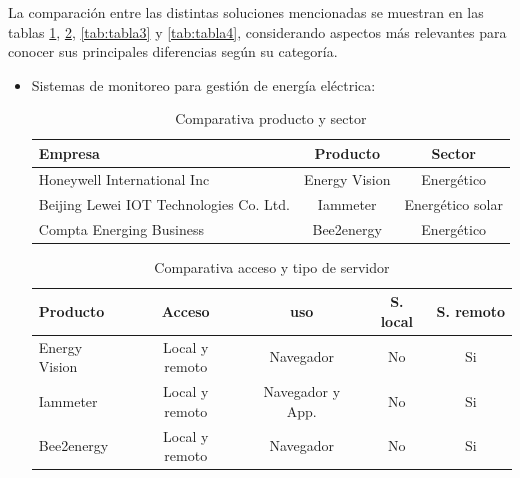 La comparación entre las distintas soluciones mencionadas se muestran en las tablas \ref{tab:tabla1}, \ref{tab:tabla2},  \ref{tab:tabla3} y \ref{tab:tabla4}, considerando aspectos más relevantes para conocer sus principales diferencias según su categoría. 
\begin{itemize}
\item Sistemas de monitoreo para gestión de energía eléctrica:

\begin{table}[h]
	\centering
	\caption[Comparativa de soluciones entre producto y sector]{Comparativa producto y sector}
	\begin{tabular}{l c c }    
		\toprule
		\textbf{Empresa} 	& \textbf{Producto} & \textbf{Sector}  \\
		\midrule
		Honeywell International Inc & Energy Vision & Energético \\		
		Beijing Lewei IOT Technologies Co. Ltd.	 & Iammeter	& Energético solar \\
		Compta Energing Business	 & Bee2energy	& Energético \\
		\bottomrule
		\hline
	\end{tabular}
	\label{tab:tabla1}
\end{table}



\begin{table}[h]
	\centering
	\caption[Comparativa de soluciones entre acceso y servidor]{Comparativa acceso y tipo de servidor}
	\begin{tabular}{l c c c c }    
		\toprule
		\textbf{Producto} & \textbf{Acceso}  & \textbf{uso} & \textbf{S. local}   & \textbf{S. remoto} \\
		\midrule
		Energy Vision & Local y remoto 	& Navegador & No & Si  \\		
		Iammeter	 & Local y remoto	& Navegador y App. & No & Si  \\
		Bee2energy	 & Local y remoto	& Navegador & No & Si  \\
		\bottomrule
		\hline
	\end{tabular}
	\label{tab:tabla2}
\end{table}





\end{itemize}
